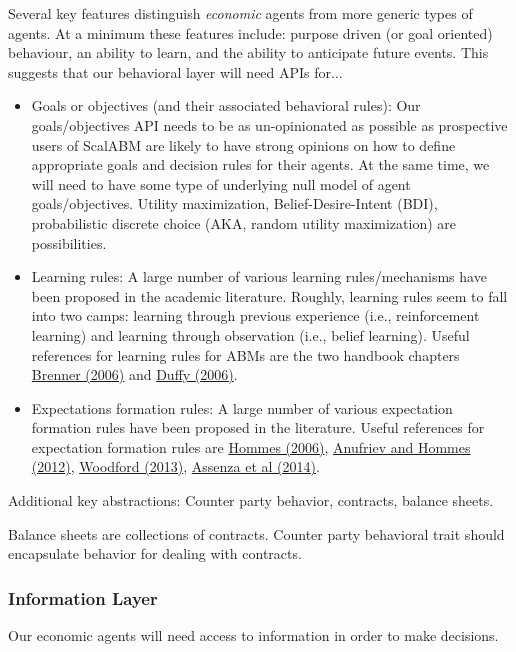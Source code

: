 \documentclass[11pt]{amsart}
\begin{document}
Several key features distinguish \textit{economic} agents from more generic types of agents. At a minimum these features include: purpose driven (or goal oriented) behaviour, an ability to learn, and the ability to anticipate future events. This suggests that our behavioral layer will need APIs for...
\begin{itemize}
    \item Goals or objectives (and their associated behavioral rules): Our goals/objectives API needs to be as un-opinionated as possible as prospective users of ScalABM are likely to have strong opinions on how to define appropriate goals and decision rules for their agents. At the same time, we will need to have some type of underlying null model of agent goals/objectives. Utility maximization, Belief-Desire-Intent (BDI), probabilistic discrete choice (AKA, random utility maximization) are possibilities.
    \item Learning rules: A large number of various learning rules/mechanisms have been proposed in the academic literature. Roughly, learning rules seem to fall into two camps: learning through previous experience (i.e., reinforcement learning) and learning through observation (i.e., belief learning). Useful references for learning rules for ABMs are the two handbook chapters \href{http://web.uvic.ca/~mingkang/econ353/project/Brenner.pdf}{Brenner (2006)} and \href{http://www.socsci.uci.edu/~duffy/papers/duffy2006.pdf}{Duffy (2006)}.
    \item Expectations formation rules: A large number of various expectation formation rules have been proposed in the literature. Useful references for expectation formation rules are \href{http://feb.kuleuven.be/fac/Slides_Degrauwe/HomHBchapter23.pdf}{Hommes (2006)}, \href{http://econ.columbia.edu/files/econ/content/hommes_background_material_2.pdf}{Anufriev and Hommes (2012)}, \href{http://www.columbia.edu/~mw2230/AREcon.pdf}{Woodford (2013)}, \href{http://www.emeraldinsight.com/doi/pdfplus/10.1108/S0193-230620140000017002}{Assenza et al (2014)}.
\end{itemize}

Additional key abstractions: Counter party behavior, contracts, balance sheets.

Balance sheets are collections of contracts. Counter party behavioral trait should encapsulate behavior for dealing with contracts.

\subsubsection{Information Layer}
Our economic agents will need access to information in order to make decisions.
\end{document}
